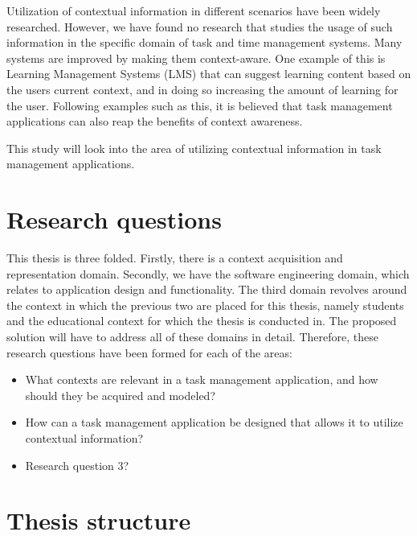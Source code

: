 Utilization of contextual information in different scenarios have been widely researched. However, we have found no research that studies the usage of such information in the specific domain of task and time management systems. Many systems are improved by making them context-aware. One example of this is Learning Management Systems (LMS) that can suggest learning content based on the users current context, and in doing so increasing the amount of learning for the user. Following examples such as this, it is believed that task management applications can also reap the benefits of context awareness.

This study will look into the area of utilizing contextual information in task management applications.





\section{Research questions}

This thesis is three folded. Firstly, there is a context acquisition and representation domain. Secondly, we have the software engineering domain, which relates to application design and functionality. The third domain revolves around the context in which the previous two are placed for this thesis, namely students and the educational context for which the thesis is conducted in. The proposed solution will have to address all of these domains in detail. Therefore, these research questions have been formed for each of the areas:
\begin{itemize}
	\item What contexts are relevant in a task management application, and how should they be acquired and modeled?
	\item How can a task management application be designed that allows it to utilize contextual information?  
	\item Research question 3?
\end{itemize}

\section{Thesis structure}